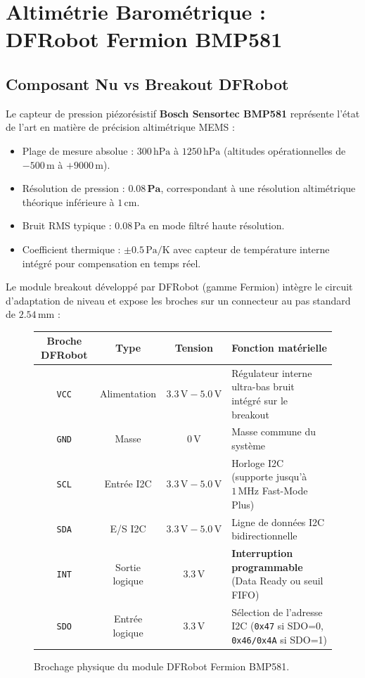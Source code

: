 \documentclass[../Materiel.tex]{subfiles}
\begin{document}
\section{Altimétrie Barométrique : DFRobot Fermion BMP581}

\subsection{Composant Nu vs Breakout DFRobot}

Le capteur de pression piézorésistif \textbf{Bosch Sensortec BMP581} représente l'état de l'art en matière de précision altimétrique MEMS :
\begin{itemize}
    \item Plage de mesure absolue : $300\,\text{hPa}$ à $1250\,\text{hPa}$ (altitudes opérationnelles de $-500\,\text{m}$ à $+9000\,\text{m}$).
    \item Résolution de pression : $\mathbf{0.08\,\text{Pa}}$, correspondant à une résolution altimétrique théorique inférieure à \textbf{$1\,\text{cm}$}.
    \item Bruit RMS typique : $0.08\,\text{Pa}$ en mode filtré haute résolution.
    \item Coefficient thermique : $\pm 0.5\,\text{Pa/K}$ avec capteur de température interne intégré pour compensation en temps réel.
\end{itemize}

Le module breakout développé par DFRobot (gamme Fermion) intègre le circuit d'adaptation de niveau et expose les broches sur un connecteur au pas standard de $2.54\,\text{mm}$ :

\begin{figure}[htbp]
\centering
\small
\begin{tabular}{|c|c|c|l|}
\hline
\textbf{Broche DFRobot} & \textbf{Type} & \textbf{Tension} & \textbf{Fonction matérielle} \\
\hline
\texttt{VCC} & Alimentation & $3.3\,\text{V} - 5.0\,\text{V}$ & Régulateur interne ultra-bas bruit intégré sur le breakout \\
\texttt{GND} & Masse & $0\,\text{V}$ & Masse commune du système \\
\texttt{SCL} & Entrée I2C & $3.3\,\text{V} - 5.0\,\text{V}$ & Horloge I2C (supporte jusqu'à $1\,\text{MHz}$ Fast-Mode Plus) \\
\texttt{SDA} & E/S I2C & $3.3\,\text{V} - 5.0\,\text{V}$ & Ligne de données I2C bidirectionnelle \\
\texttt{INT} & Sortie logique & $3.3\,\text{V}$ & \textbf{Interruption programmable} (Data Ready ou seuil FIFO) \\
\texttt{SDO} & Entrée logique & $3.3\,\text{V}$ & Sélection de l'adresse I2C (\texttt{0x47} si SDO=0, \texttt{0x46/0x4A} si SDO=1) \\
\hline
\end{tabular}
\caption{Brochage physique du module DFRobot Fermion BMP581.}
\end{figure}
\end{document}
